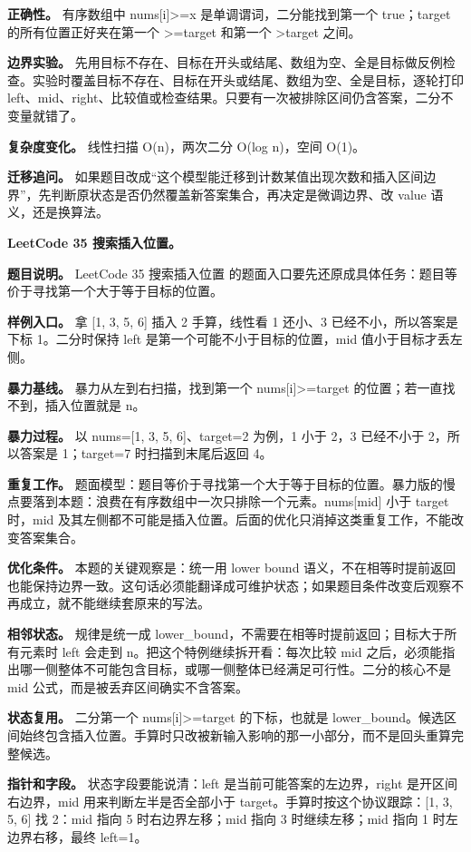 \textbf{正确性。} 有序数组中 nums[i]>=x 是单调谓词，二分能找到第一个 true；target 的所有位置正好夹在第一个 >=target 和第一个 >target 之间。

\textbf{边界实验。} 先用目标不存在、目标在开头或结尾、数组为空、全是目标做反例检查。实验时覆盖目标不存在、目标在开头或结尾、数组为空、全是目标，逐轮打印 left、mid、right、比较值或检查结果。只要有一次被排除区间仍含答案，二分不变量就错了。

\textbf{复杂度变化。} 线性扫描 O(n)，两次二分 O(log n)，空间 O(1)。

\textbf{迁移追问。} 如果题目改成“这个模型能迁移到计数某值出现次数和插入区间边界”，先判断原状态是否仍然覆盖新答案集合，再决定是微调边界、改 value 语义，还是换算法。

\noindent\textbf{LeetCode 35 搜索插入位置。}

\textbf{题目说明。} LeetCode 35 搜索插入位置 的题面入口要先还原成具体任务：题目等价于寻找第一个大于等于目标的位置。

\textbf{样例入口。} 拿 [1, 3, 5, 6] 插入 2 手算，线性看 1 还小、3 已经不小，所以答案是下标 1。二分时保持 left 是第一个可能不小于目标的位置，mid 值小于目标才丢左侧。

\textbf{暴力基线。} 暴力从左到右扫描，找到第一个 nums[i]>=target 的位置；若一直找不到，插入位置就是 n。

\textbf{暴力过程。} 以 nums=[1, 3, 5, 6]、target=2 为例，1 小于 2，3 已经不小于 2，所以答案是 1；target=7 时扫描到末尾后返回 4。

\textbf{重复工作。} 题面模型：题目等价于寻找第一个大于等于目标的位置。暴力版的慢点要落到本题：浪费在有序数组中一次只排除一个元素。nums[mid] 小于 target 时，mid 及其左侧都不可能是插入位置。后面的优化只消掉这类重复工作，不能改变答案集合。

\textbf{优化条件。} 本题的关键观察是：统一用 lower bound 语义，不在相等时提前返回也能保持边界一致。这句话必须能翻译成可维护状态；如果题目条件改变后观察不再成立，就不能继续套原来的写法。

\textbf{相邻状态。} 规律是统一成 lower\_bound，不需要在相等时提前返回；目标大于所有元素时 left 会走到 n。把这个特例继续拆开看：每次比较 mid 之后，必须能指出哪一侧整体不可能包含目标，或哪一侧整体已经满足可行性。二分的核心不是 mid 公式，而是被丢弃区间确实不含答案。

\textbf{状态复用。} 二分第一个 nums[i]>=target 的下标，也就是 lower\_bound。候选区间始终包含插入位置。手算时只改被新输入影响的那一小部分，而不是回头重算完整候选。

\textbf{指针和字段。} 状态字段要能说清：left 是当前可能答案的左边界，right 是开区间右边界，mid 用来判断左半是否全部小于 target。手算时按这个协议跟踪：[1, 3, 5, 6] 找 2：mid 指向 5 时右边界左移；mid 指向 3 时继续左移；mid 指向 1 时左边界右移，最终 left=1。


